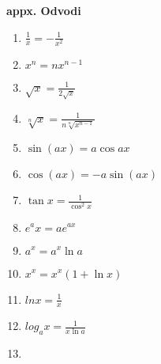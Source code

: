\documentclass{article}
\begin{document}
\begin{multicols}{3}
\textbf{appx. Odvodi}
\begin{center}
    \begin{enumerate}
        \item \begin{math}
            \frac{1}{x} = -\frac{1}{x^2}
        \end{math}
        \item \begin{math}
            x^n  = nx^{n-1}
        \end{math}
        \item \begin{math}
            \sqrt{x} = \frac{1}{2 \sqrt{x}}
        \end{math}
        \item \begin{math}
            \sqrt[n] x = \frac{1}{n \sqrt[n]{x^{n-1}}}
        \end{math}
        \item \begin{math}
            \sin (a x) =  a  \cos a x
        \end{math}
        \item  \begin{math}
            \cos (a x) = - a \sin (a x)
        \end{math}
        \item \begin{math}
            \tan x = \frac{1}{\cos^2 x} 
        \end{math}
        \item \begin{math}
            e^ax = ae^{ax}
        \end{math}
        \item \begin{math}
            a^x = a^x \ln a
        \end{math}
        \item \begin{math}
            x^x = x^x (1+\ln x)
        \end{math}
        \item \begin{math}
            ln x = \frac{1}{x}
        \end{math}
        \item \begin{math}
            log_a x = \frac{1}{x \ln a}
        \end{math}
        \item \begin{math}

\end{math}
\end{enumerate}
\end{center}
\end{multicols}
\end{document}
